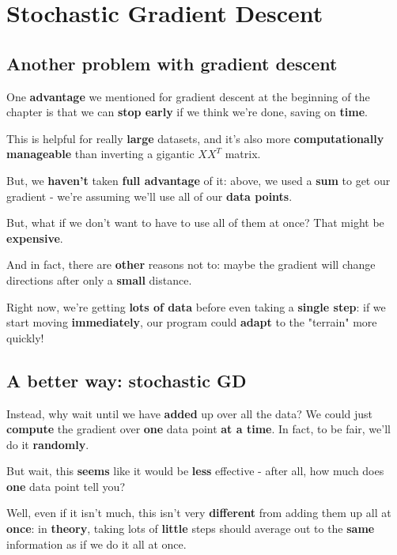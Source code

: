 
\section*{Stochastic Gradient Descent}

    \subsection*{Another problem with gradient descent}
        One \textbf{advantage} we mentioned for gradient descent at the beginning of the chapter is that we can \textbf{stop early} if we think we're done, saving on \textbf{time}.
        
        This is helpful for really \textbf{large} datasets, and it's also more \textbf{computationally manageable} than inverting a gigantic $XX^T$ matrix.
        
        But, we \textbf{haven't} taken \textbf{full advantage} of it: above, we used a \textbf{sum} to get our gradient - we're assuming we'll use all of our \textbf{data points}.
        
        But, what if we don't want to have to use all of them at once? That might be \textbf{expensive}. 
        
        And in fact, there are \textbf{other} reasons not to: maybe the gradient will change directions after only a \textbf{small} distance. 
        
        Right now, we're getting \textbf{lots of data} before even taking a \textbf{single step}: if we start moving \textbf{immediately}, our program could \textbf{adapt} to the "terrain" more quickly!
        
    \subsection*{A better way: stochastic GD}
        
        Instead, why wait until we have \textbf{added} up over all the data? We could just \textbf{compute} the gradient over \textbf{one} data point \textbf{at a time}. In fact, to be fair, we'll do it \textbf{randomly}. 
        
        But wait, this \textbf{seems} like it would be \textbf{less} effective - after all, how much does \textbf{one} data point tell you? 
        
        Well, even if it isn't much, this isn't very \textbf{different} from adding them up all at \textbf{once}: in \textbf{theory}, taking lots of \textbf{little} steps should average out to the \textbf{same} information as if we do it all at once.\\
        
